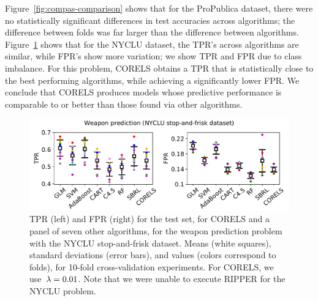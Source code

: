 Figure~\ref{fig:compas-comparison} shows that for the ProPublica dataset,
there were no statistically significant differences in test accuracies across algorithms;
the difference between folds was far larger than the difference between algorithms.
%
Figure~\ref{fig:weapon-comparison} shows that for the NYCLU dataset,
the TPR's across algorithms are similar, while FPR's show more variation;
we show TPR and FPR due to class imbalance.
%
For this problem, CORELS obtains a TPR that is statistically close to the best performing algorithms,
while achieving a significantly lower FPR.
%
We conclude that CORELS produces models whose predictive performance is comparable to or better than
those found via other algorithms.

\begin{figure}[t!]
\begin{center}
\includegraphics[trim={2mm, 10mm, 2mm, 0mm},
width=\textwidth]{figs/compare-weapon.pdf}
\end{center}
\caption{TPR (left) and FPR (right) for the test set,
for CORELS and a panel of seven other algorithms,
for the weapon prediction problem with the NYCLU stop-and-frisk dataset.
%
Means (white squares),
standard deviations (error bars),
and values (colors correspond to folds),
for 10-fold cross-validation experiments.
%
For CORELS, we use~${{\lambda}=0.01}$.
%
Note that we were unable to execute RIPPER for the NYCLU problem.
}
\label{fig:weapon-comparison}
\end{figure}
%
